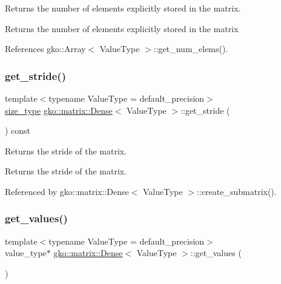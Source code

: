 Returns the number of elements explicitly stored in the matrix. 

\begin{DoxyReturn}{Returns}
the number of elements explicitly stored in the matrix 
\end{DoxyReturn}


References gko\+::\+Array$<$ Value\+Type $>$\+::get\+\_\+num\+\_\+elems().

\mbox{\label{classgko_1_1matrix_1_1Dense_a8c1b220b9b9292893d9be22d632a9a0e}} 
\subsubsection{\texorpdfstring{get\+\_\+stride()}{get\_stride()}}
{\footnotesize\ttfamily template$<$typename Value\+Type = default\+\_\+precision$>$ \\
\hyperlink{namespacegko_a6e5c95df0ae4e47aab2f604a22d98ee7}{size\+\_\+type} \hyperlink{classgko_1_1matrix_1_1Dense}{gko\+::matrix\+::\+Dense}$<$ Value\+Type $>$\+::get\+\_\+stride (\begin{DoxyParamCaption}{ }\end{DoxyParamCaption}) const\hspace{0.3cm}{\ttfamily [noexcept]}}



Returns the stride of the matrix. 

\begin{DoxyReturn}{Returns}
the stride of the matrix. 
\end{DoxyReturn}


Referenced by gko\+::matrix\+::\+Dense$<$ Value\+Type $>$\+::create\+\_\+submatrix().

\mbox{\label{classgko_1_1matrix_1_1Dense_a3bc458e02fab8e4c9f60f70bd4d5a4f9}} 
\subsubsection{\texorpdfstring{get\+\_\+values()}{get\_values()}}
{\footnotesize\ttfamily template$<$typename Value\+Type = default\+\_\+precision$>$ \\
value\+\_\+type$\ast$ \hyperlink{classgko_1_1matrix_1_1Dense}{gko\+::matrix\+::\+Dense}$<$ Value\+Type $>$\+::get\+\_\+values (\begin{DoxyParamCaption}{ }\end{DoxyParamCaption})\hspace{0.3cm}{\ttfamily [noexcept]}}



